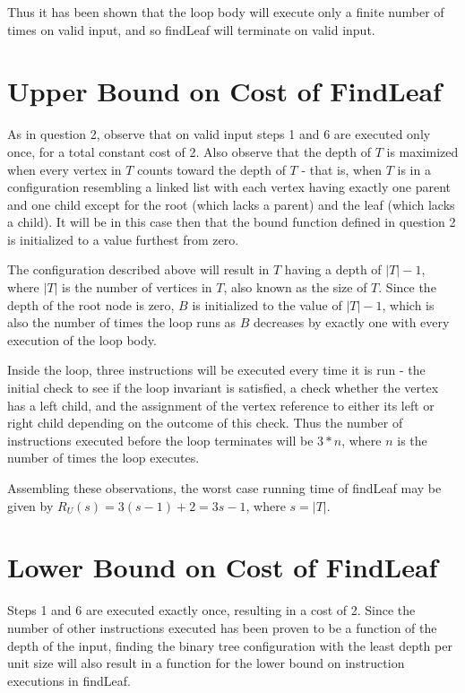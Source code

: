 \documentclass{article}
\begin{document}
Thus it has been shown that the loop body will execute only a finite number of
times on valid input, and so findLeaf will terminate on valid input.

\section{Upper Bound on Cost of FindLeaf}

As in question 2, observe that on valid input steps 1 and 6 are executed only
once, for a total constant cost of 2. Also observe that the depth of $T$ is
maximized when every vertex in $T$ counts toward the depth of $T$ - that is,
when $T$ is in a configuration resembling a linked list with each vertex having
exactly one parent and one child except for the root (which lacks a parent) and
the leaf (which lacks a child). It will be in this case then that the bound
function defined in question 2 is initialized to a value furthest from zero.

The configuration described above will result in $T$ having a depth of
$|T|-1$, where $|T|$ is the number of vertices in $T$, also known as the size of
$T$. Since the depth of the root node is zero, $B$ is initialized to the value
of $|T|-1$, which is also the number of times the loop runs as $B$
decreases by exactly one with every execution of the loop body.

Inside the loop, three instructions will be executed every time it is run - the
initial check to see if the loop invariant is satisfied, a check whether the
vertex has a left child, and the assignment of the vertex reference to either
its left or right child depending on the outcome of this check. Thus the number
of instructions executed before the loop terminates will be $3*n$, where $n$ is
the number of times the loop executes.

Assembling these observations, the worst case running time of findLeaf may be
given by $R_U(s) = 3(s-1)+2 = 3s-1$, where $s=|T|$.

\section{Lower Bound on Cost of FindLeaf}

Steps 1 and 6 are executed exactly once, resulting in a cost of 2.
Since the number of other instructions executed has been proven to
be a function of the depth of the input, finding the binary tree
configuration with the least depth per unit size will also result in
a function for the lower bound on instruction executions in findLeaf.
\end{document}
